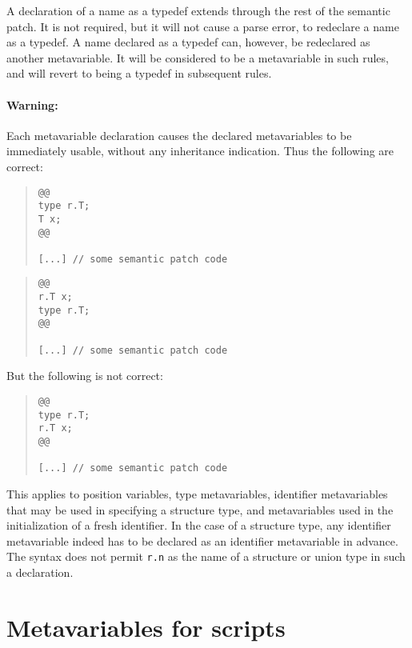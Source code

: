 A declaration of a name as a typedef extends through the rest of the
semantic patch.  It is not required, but it will not cause a parse error,
to redeclare a name as a typedef.  A name declared as a typedef can,
however, be redeclared as another metavariable.  It will be considered to
be a metavariable in such rules, and will revert to being a typedef in
subsequent rules.

\paragraph*{Warning:} Each metavariable declaration causes the declared
metavariables to be immediately usable, without any inheritance
indication.  Thus the following are correct:

\begin{quote}
\begin{verbatim}
@@
type r.T;
T x;
@@

[...] // some semantic patch code
\end{verbatim}
\end{quote}

\begin{quote}
\begin{verbatim}
@@
r.T x;
type r.T;
@@

[...] // some semantic patch code
\end{verbatim}
\end{quote}

\noindent
But the following is not correct:

\begin{quote}
\begin{verbatim}
@@
type r.T;
r.T x;
@@

[...] // some semantic patch code
\end{verbatim}
\end{quote}

This applies to position variables, type metavariables, identifier
metavariables that may be used in specifying a structure type, and
metavariables used in the initialization of a fresh identifier.  In the
case of a structure type, any identifier metavariable indeed has to be
declared as an identifier metavariable in advance.  The syntax does not
permit {\tt r.n} as the name of a structure or union type in such a
declaration.

\section{Metavariables for scripts}

